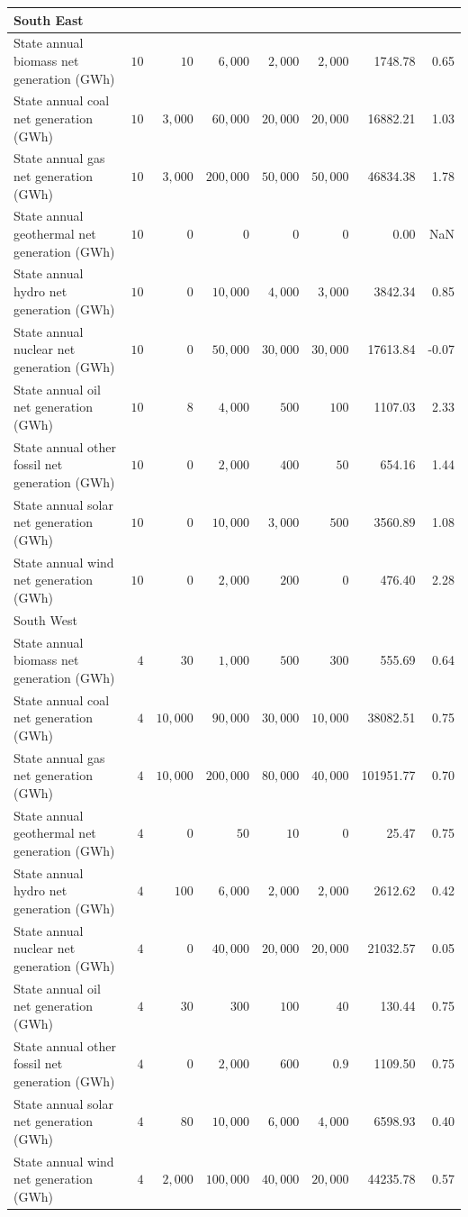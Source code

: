 \documentclass[
]{article}
\begin{document}
\begin{longtable}{lrrrrrrr}
\midrule
\multicolumn{8}{l}{South East} \\ 
\midrule
State annual biomass net generation (GWh) & $10$ & $10$ & $6,000$ & $2,000$ & $2,000$ & 1748.78 & 0.65 \\ 
State annual coal net generation (GWh) & $10$ & $3,000$ & $60,000$ & $20,000$ & $20,000$ & 16882.21 & 1.03 \\ 
State annual gas net generation (GWh) & $10$ & $3,000$ & $200,000$ & $50,000$ & $50,000$ & 46834.38 & 1.78 \\ 
State annual geothermal net generation (GWh) & $10$ & $0$ & $0$ & $0$ & $0$ & 0.00 & NaN \\ 
State annual hydro net generation (GWh) & $10$ & $0$ & $10,000$ & $4,000$ & $3,000$ & 3842.34 & 0.85 \\ 
State annual nuclear net generation (GWh) & $10$ & $0$ & $50,000$ & $30,000$ & $30,000$ & 17613.84 & -0.07 \\ 
State annual oil net generation (GWh) & $10$ & $8$ & $4,000$ & $500$ & $100$ & 1107.03 & 2.33 \\ 
State annual other fossil net generation (GWh) & $10$ & $0$ & $2,000$ & $400$ & $50$ & 654.16 & 1.44 \\ 
State annual solar net generation (GWh) & $10$ & $0$ & $10,000$ & $3,000$ & $500$ & 3560.89 & 1.08 \\ 
State annual wind net generation (GWh) & $10$ & $0$ & $2,000$ & $200$ & $0$ & 476.40 & 2.28 \\ 
\midrule
\multicolumn{8}{l}{South West} \\ 
\midrule
State annual biomass net generation (GWh) & $4$ & $30$ & $1,000$ & $500$ & $300$ & 555.69 & 0.64 \\ 
State annual coal net generation (GWh) & $4$ & $10,000$ & $90,000$ & $30,000$ & $10,000$ & 38082.51 & 0.75 \\ 
State annual gas net generation (GWh) & $4$ & $10,000$ & $200,000$ & $80,000$ & $40,000$ & 101951.77 & 0.70 \\ 
State annual geothermal net generation (GWh) & $4$ & $0$ & $50$ & $10$ & $0$ & 25.47 & 0.75 \\ 
State annual hydro net generation (GWh) & $4$ & $100$ & $6,000$ & $2,000$ & $2,000$ & 2612.62 & 0.42 \\ 
State annual nuclear net generation (GWh) & $4$ & $0$ & $40,000$ & $20,000$ & $20,000$ & 21032.57 & 0.05 \\ 
State annual oil net generation (GWh) & $4$ & $30$ & $300$ & $100$ & $40$ & 130.44 & 0.75 \\ 
State annual other fossil net generation (GWh) & $4$ & $0$ & $2,000$ & $600$ & $0.9$ & 1109.50 & 0.75 \\ 
State annual solar net generation (GWh) & $4$ & $80$ & $10,000$ & $6,000$ & $4,000$ & 6598.93 & 0.40 \\ 
State annual wind net generation (GWh) & $4$ & $2,000$ & $100,000$ & $40,000$ & $20,000$ & 44235.78 & 0.57 \\ 
\bottomrule
\end{longtable}
\end{document}
